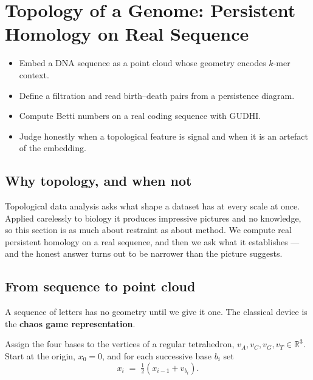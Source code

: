 \section{Topology of a Genome: Persistent Homology on Real Sequence}\label{sec:tda}

\begin{objectives}
\begin{itemize}[leftmargin=*,itemsep=1pt,topsep=1pt]
  \item Embed a DNA sequence as a point cloud whose geometry encodes $k$-mer context.
  \item Define a filtration and read birth--death pairs from a persistence diagram.
  \item Compute Betti numbers on a real coding sequence with GUDHI.
  \item Judge honestly when a topological feature is signal and when it is an artefact of the embedding.
\end{itemize}
\end{objectives}

\subsection{Why topology, and when not}

Topological data analysis asks what shape a dataset has at every scale at once.
Applied carelessly to biology it produces impressive pictures and no knowledge,
so this section is as much about restraint as about method. We compute real
persistent homology on a real sequence, and then we ask what it establishes ---
and the honest answer turns out to be narrower than the picture suggests.

\subsection{From sequence to point cloud}

A sequence of letters has no geometry until we give it one. The classical device
is the \textbf{chaos game representation}.

\begin{definition}\label{def:cgr}
Assign the four bases to the vertices of a regular tetrahedron,
$v_A, v_C, v_G, v_T \in \mathbb{R}^3$. Start at the origin, $x_0 = 0$, and for
each successive base $b_i$ set
\begin{equation}\label{eq:cgr}
  x_i \;=\; \tfrac{1}{2}\left(x_{i-1} + v_{b_i}\right).
\end{equation}
\end{definition}


